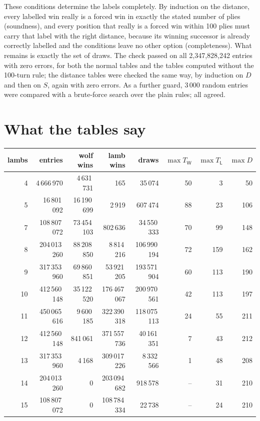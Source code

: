 \documentclass[11pt,a4paper]{article}
\newcommand{\W}{\mathsf{W}}
\newcommand{\Lb}{\mathsf{L}}
\begin{document}
These conditions determine the labels completely. By induction on the distance,
every labelled win really is a forced win in exactly the stated number of plies
(soundness), and every position that really is a forced win within 100 plies must
carry that label with the right distance, because its winning successor is
already correctly labelled and the conditions leave no other option
(completeness). What remains is exactly the set of draws. The check passed on all
2,347,828,242 entries with zero errors, for both the normal tables and the
tables computed without the 100-turn rule; the distance tables were checked the
same way, by induction on $D$ and then on $S$, again with zero errors. As a
further guard, 3\,000 random entries were compared with a brute-force search
over the plain rules; all agreed.

\section*{What the tables say}

\begin{center}\footnotesize
\begin{tabular}{@{}rrrrrrrr@{}}
\toprule
lambs & entries & wolf wins & lamb wins & draws & $\max T_{\W}$ & $\max T_{\Lb}$ & $\max D$ \\
\midrule
4  & 4\,666\,970   & 4\,631\,731  & 165         & 35\,074      & 50 & 3   & 50 \\
5  & 16\,801\,092  & 16\,190\,699 & 2\,919       & 607\,474     & 88 & 23  & 106 \\
7  & 108\,807\,072 & 73\,454\,103 & 802\,636     & 34\,550\,333  & 70 & 99  & 148 \\
8  & 204\,013\,260 & 88\,208\,850 & 8\,814\,216   & 106\,990\,194 & 72 & 159 & 162 \\
9  & 317\,353\,960 & 69\,860\,851 & 53\,921\,205  & 193\,571\,904 & 60 & 113 & 190 \\
10 & 412\,560\,148 & 35\,122\,520 & 176\,467\,067 & 200\,970\,561 & 42 & 113 & 197 \\
11 & 450\,065\,616 & 9\,600\,185  & 322\,390\,318 & 118\,075\,113 & 24 & 55  & 211 \\
12 & 412\,560\,148 & 841\,061    & 371\,557\,736 & 40\,161\,351  & 7  & 43  & 212 \\
13 & 317\,353\,960 & 4\,168      & 309\,017\,226 & 8\,332\,566   & 1  & 48  & 208 \\
14 & 204\,013\,260 & 0          & 203\,094\,682 & 918\,578     & -- & 31  & 210 \\
15 & 108\,807\,072 & 0          & 108\,784\,334 & 22\,738      & -- & 24  & 210 \\
\bottomrule
\end{tabular}
\end{center}
\end{document}

